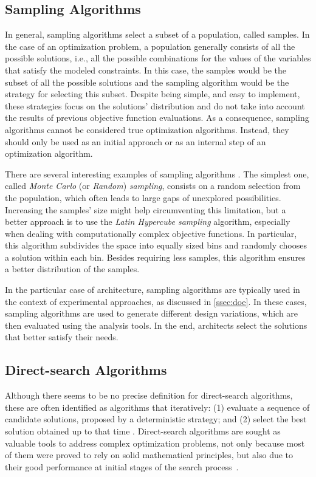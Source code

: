	\subsection{Sampling Algorithms}
	\label{ssec:sampling}
	In general, sampling algorithms select a subset of a population, called samples. In the case of an optimization problem, a population generally consists of all the possible solutions, i.e., all the possible combinations for the values of the variables that satisfy the modeled constraints. In this case, the samples would be the subset of all the possible solutions and the sampling algorithm would be the strategy for selecting this subset. Despite being simple, and easy to implement, these strategies focus on the solutions' distribution and do not take into account the results of previous objective function evaluations. As a consequence, sampling algorithms cannot be considered true optimization algorithms. Instead, they should only be used as an initial approach or as an internal step of an optimization algorithm.
	
	There are several interesting examples of sampling algorithms \cite{Tille2006}. The simplest one, called \textit{Monte Carlo} (or \textit{Random}) \textit{sampling}, consists on a random selection from the population, which often leads to large gaps of unexplored possibilities. Increasing the samples' size might help circumventing this limitation, but a better approach is to use the \textit{Latin Hypercube sampling} algorithm, especially when dealing with computationally complex objective functions. In particular, this algorithm subdivides the space into equally sized bins and randomly chooses a solution within each bin. Besides requiring less samples, this algorithm ensures a better distribution of the samples.
	
	In the particular case of architecture, sampling algorithms are typically used in the context of experimental approaches, as discussed in \cref{ssec:doe}. In these cases, sampling algorithms are used to generate different design variations, which are then evaluated using the analysis tools. In the end, architects select the solutions that better satisfy their needs.
	
	\subsection{Direct-search Algorithms}
	\label{ssec:direct-search}
	
	Although there seems to be no precise definition for direct-search algorithms, these are often identified as algorithms that iteratively: (1) evaluate a sequence of candidate solutions, proposed by a deterministic strategy; and (2) select the best solution obtained up to that time \cite{Conn2009}. Direct-search algorithms are sought as valuable tools to address complex optimization problems, not only because most of them were proved to rely on solid mathematical principles, but also due to their good performance at initial stages of the search process~\cite{Rios2013}. 
	
